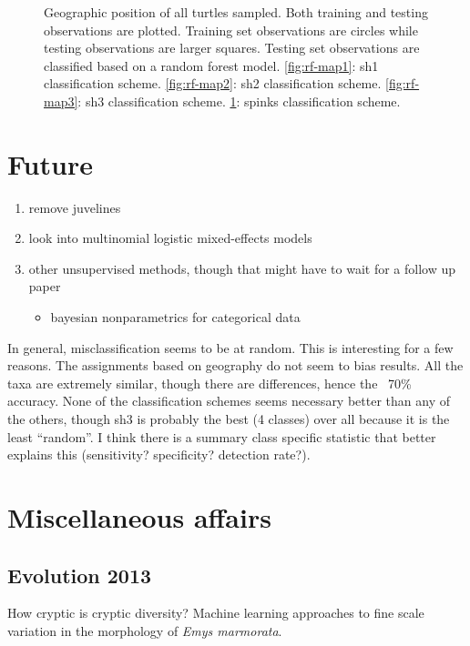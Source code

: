 \documentclass{article}\usepackage{graphicx, color}
\begin{document}
\begin{figure}[t]
\begin{subfigure}[b]{0.5\textwidth}
    \label{fig:rf-map4}
  \end{subfigure}
  \caption{Geographic position of all turtles sampled. Both training and testing observations are plotted. Training set observations are circles while testing observations are larger squares. Testing set observations are classified based on a random forest model. \ref{fig:rf-map1}: sh1 classification scheme. \ref{fig:rf-map2}: sh2 classification scheme. \ref{fig:rf-map3}: sh3 classification scheme. \ref{fig:rf-map4}: spinks classification scheme.}
  \label{fig:rf-map}
\end{figure}


\section{Future}
\begin{enumerate}
  \item remove juvelines
  \item look into multinomial logistic mixed-effects models
  \item other unsupervised methods, though that might have to wait for a follow up paper
    \begin{itemize}
      \item bayesian nonparametrics for categorical data
    \end{itemize}
\end{enumerate}

In general, misclassification seems to be at random. This is interesting for a few reasons. The assignments based on geography do not seem to bias results. All the taxa are extremely similar, though there are differences, hence the ~70\% accuracy. None of the classification schemes seems necessary better than any of the others, though sh3 is probably the best (4 classes) over all because it is the least ``random''. I think there is a summary class specific statistic that better explains this (sensitivity? specificity? detection rate?).

\section{Miscellaneous affairs}
\subsection{Evolution 2013}
How cryptic is cryptic diversity? Machine learning approaches to fine scale variation in the morphology of \textit{Emys marmorata}.
\end{document}
